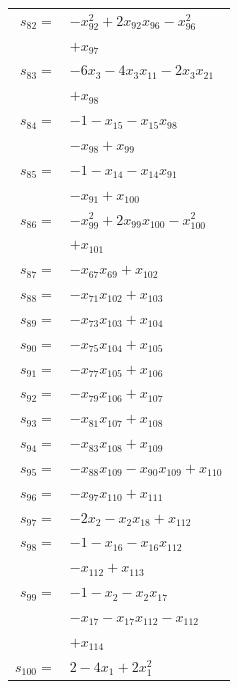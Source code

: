 \begin{longtable}{@{}r@{\;}l@{}}
\(s_{82}=\) & \(\displaystyle -x_{92}^{2} +2x_{92}x_{96} -x_{96}^{2}\) \\
 & \(\displaystyle +x_{97}\) \\[3pt]
\(s_{83}=\) & \(\displaystyle -6x_{3} -4x_{3}x_{11} -2x_{3}x_{21}\) \\
 & \(\displaystyle +x_{98}\) \\[3pt]
\(s_{84}=\) & \(\displaystyle -1 -x_{15} -x_{15}x_{98}\) \\
 & \(\displaystyle -x_{98} +x_{99}\) \\[3pt]
\(s_{85}=\) & \(\displaystyle -1 -x_{14} -x_{14}x_{91}\) \\
 & \(\displaystyle -x_{91} +x_{100}\) \\[3pt]
\(s_{86}=\) & \(\displaystyle -x_{99}^{2} +2x_{99}x_{100} -x_{100}^{2}\) \\
 & \(\displaystyle +x_{101}\) \\[3pt]
\(s_{87}=\) & \(\displaystyle -x_{67}x_{69} +x_{102}\) \\[3pt]
\(s_{88}=\) & \(\displaystyle -x_{71}x_{102} +x_{103}\) \\[3pt]
\(s_{89}=\) & \(\displaystyle -x_{73}x_{103} +x_{104}\) \\[3pt]
\(s_{90}=\) & \(\displaystyle -x_{75}x_{104} +x_{105}\) \\[3pt]
\(s_{91}=\) & \(\displaystyle -x_{77}x_{105} +x_{106}\) \\[3pt]
\(s_{92}=\) & \(\displaystyle -x_{79}x_{106} +x_{107}\) \\[3pt]
\(s_{93}=\) & \(\displaystyle -x_{81}x_{107} +x_{108}\) \\[3pt]
\(s_{94}=\) & \(\displaystyle -x_{83}x_{108} +x_{109}\) \\[3pt]
\(s_{95}=\) & \(\displaystyle -x_{88}x_{109} -x_{90}x_{109} +x_{110}\) \\[3pt]
\(s_{96}=\) & \(\displaystyle -x_{97}x_{110} +x_{111}\) \\[3pt]
\(s_{97}=\) & \(\displaystyle -2x_{2} -x_{2}x_{18} +x_{112}\) \\[3pt]
\(s_{98}=\) & \(\displaystyle -1 -x_{16} -x_{16}x_{112}\) \\
 & \(\displaystyle -x_{112} +x_{113}\) \\[3pt]
\(s_{99}=\) & \(\displaystyle -1 -x_{2} -x_{2}x_{17}\) \\
 & \(\displaystyle -x_{17} -x_{17}x_{112} -x_{112}\) \\
 & \(\displaystyle +x_{114}\) \\[3pt]
\(s_{100}=\) & \(\displaystyle 2 -4x_{1} +2x_{1}^{2}\) \\

\end{longtable}
